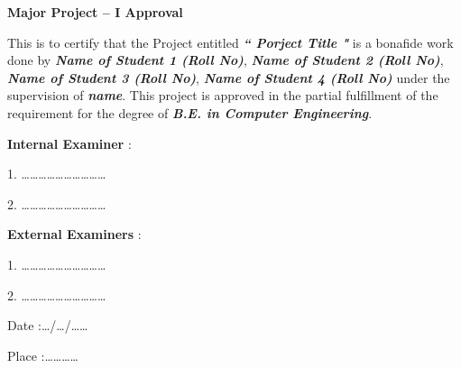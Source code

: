 \pagestyle{empty}
\begin{center}
\LARGE{\textbf{Major Project – I Approval}}\\[1cm]
\end{center}
\vspace{0.5in}

\justify \large{This is to certify that the Project entitled \textbf{\textit{`` Porject Title "}} is a bonafide work done by \textbf{\textit{Name of Student 1 (Roll No)}}, \textbf{\textit{Name of Student 2 (Roll No)}}, \textbf{\textit{Name of Student 3 (Roll No)}}, \textbf{\textit{Name of Student 4 (Roll No)}} under the supervision of \textbf{\textit{\@guide name}}. This project is approved in the partial fulfillment of the requirement for the degree of \textbf{\textit{ B.E. in Computer Engineering}}.

\vspace{1in}

\hspace{9cm}\textbf{Internal Examiner} :\vspace{0.3in}

\hspace{9cm}1. \ldots\ldots\ldots\ldots\ldots\ldots\ldots\ldots\ldots\ldots

\vspace{0.3in}

\hspace{9cm}2. \ldots\ldots\ldots\ldots\ldots\ldots\ldots\ldots\ldots\ldots

\vspace{0.5in}

\hspace{9cm}\textbf{External Examiners} :\vspace{0.3in}

\hspace{9cm}1. \ldots\ldots\ldots\ldots\ldots\ldots\ldots\ldots\ldots\ldots

\vspace{0.3in}

\hspace{9cm}2. \ldots\ldots\ldots\ldots\ldots\ldots\ldots\ldots\ldots\ldots}

\vspace{0.5in}





Date :\hspace{0.2cm}\ldots/\ldots/\ldots\ldots

\vspace{0.2in}

Place :\hspace{0.2cm}\ldots\ldots\ldots\ldots